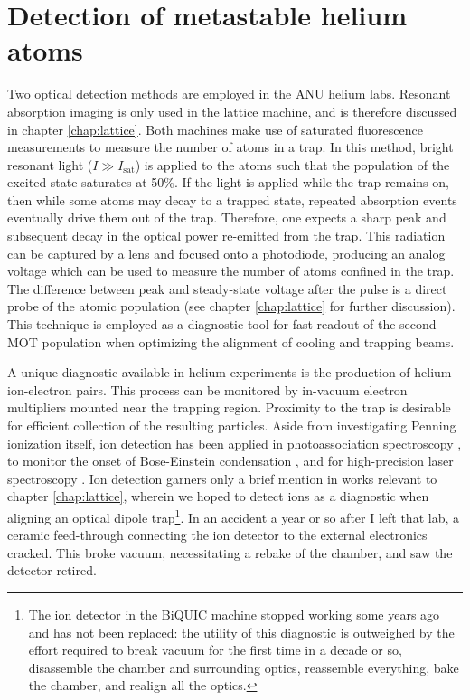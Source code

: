 \section{Detection of metastable helium atoms}
\label{sec:he_detection}
	Two optical detection methods are employed in the ANU helium labs.
	Resonant absorption imaging is only used in the lattice machine, and is therefore discussed in chapter \ref{chap:lattice}.
	Both machines make use of saturated fluorescence measurements to measure the number of atoms in a trap.
	In this method, bright resonant light ($I\gg I_\textrm{sat}$) is applied to the atoms such that the population of the excited state saturates at 50\%.
	If the light is applied while the trap remains on, then while some atoms may decay to a trapped state, repeated absorption events eventually drive them out of the trap.
	Therefore, one expects a sharp peak and subsequent decay in the optical power re-emitted from the trap.
	This radiation can be captured by a lens and focused onto a photodiode, producing an analog voltage which can be used to measure the number of atoms confined in the trap.
	The difference between peak and steady-state voltage after the pulse is a direct probe of the atomic population (see chapter \ref{chap:lattice} for further discussion).
	This technique is employed as a diagnostic tool for fast readout of the second MOT population when optimizing the alignment of cooling and trapping beams. 

	A unique diagnostic available in helium experiments is the production of helium ion-electron pairs.
	This process can be monitored by in-vacuum electron multipliers mounted near the trapping region.
	Proximity to the trap is desirable for efficient collection of the resulting particles.
	Aside from investigating Penning ionization itself, ion detection has been applied in photoassociation spectroscopy \cite{Herschbach00,Koelemeij04}, to monitor the onset of Bose-Einstein condensation \cite{Tychkov06}, and for high-precision laser spectroscopy \cite{Rengelink18}.
	Ion detection garners only a brief mention in works relevant to chapter \ref{chap:lattice}, wherein we hoped to detect ions as a diagnostic when aligning an optical dipole trap\footnote{The ion detector in the BiQUIC machine stopped working some years ago and has not been replaced: the utility of this diagnostic is outweighed by the effort required to break vacuum for the first time in a decade or so, disassemble the chamber and surrounding optics, reassemble everything, bake the chamber, and realign all the optics.}.
	In an accident a year or so after I left that lab, a ceramic feed-through connecting the ion detector to the external electronics cracked.
	This broke vacuum, necessitating a rebake of the chamber, and saw the detector retired.
	


